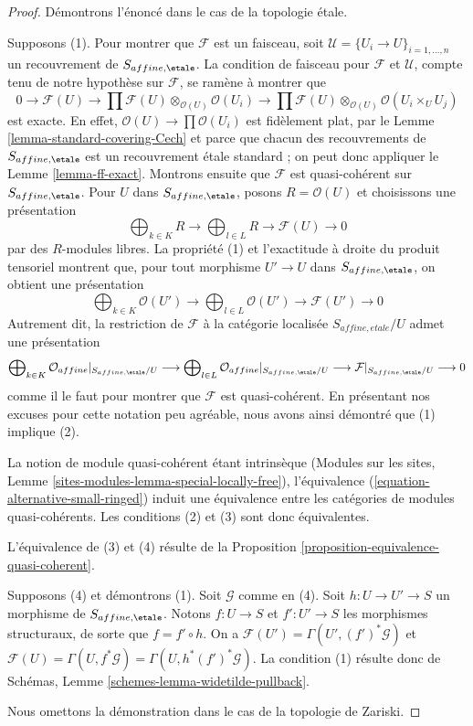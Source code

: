 \begin{proof}
Démontrons l'énoncé dans le cas de la topologie \'etale.

\medskip\noindent
Supposons (1). Pour montrer que $\mathcal{F}$ est un faisceau, soit
$\mathcal{U} = \{U_i \to U\}_{i = 1, \ldots, n}$ un recouvrement de
$S_{affine, \etale}$. La condition de faisceau pour $\mathcal{F}$ et
$\mathcal{U}$, compte tenu de notre hypothèse sur $\mathcal{F}$, se ramène à
montrer que
$$
0 \to \mathcal{F}(U) \to
\prod \mathcal{F}(U) \otimes_{\mathcal{O}(U)} \mathcal{O}(U_i) \to
\prod \mathcal{F}(U) \otimes_{\mathcal{O}(U)} \mathcal{O}(U_i \times_U U_j)
$$
est exacte. En effet, $\mathcal{O}(U) \to \prod \mathcal{O}(U_i)$ est
fidèlement plat, par le Lemme \ref{lemma-standard-covering-Cech} et parce que
chacun des recouvrements de $S_{affine, \etale}$ est un recouvrement
\'etale standard ; on peut donc appliquer le Lemme \ref{lemma-ff-exact}.
Montrons ensuite que $\mathcal{F}$ est quasi-cohérent sur
$S_{affine, \etale}$. Pour $U$ dans $S_{affine, \etale}$, posons
$R = \mathcal{O}(U)$ et choisissons une présentation
$$
\bigoplus\nolimits_{k \in K} R
\longrightarrow
\bigoplus\nolimits_{l \in L} R
\longrightarrow
\mathcal{F}(U)
\longrightarrow 0
$$
par des $R$-modules libres. La propriété (1) et l'exactitude à droite du
produit tensoriel montrent que, pour tout morphisme $U' \to U$ dans
$S_{affine, \etale}$, on obtient une présentation
$$
\bigoplus\nolimits_{k \in K} \mathcal{O}(U')
\longrightarrow
\bigoplus\nolimits_{l \in L} \mathcal{O}(U')
\longrightarrow
\mathcal{F}(U')
\longrightarrow 0
$$
Autrement dit, la restriction de $\mathcal{F}$ à la catégorie localisée
$S_{affine, etale}/U$ admet une présentation
$$
\bigoplus\nolimits_{k \in K} \mathcal{O}_{affine}|_{S_{affine, \etale}/U}
\longrightarrow
\bigoplus\nolimits_{l \in L} \mathcal{O}_{affine}|_{S_{affine, \etale}/U}
\longrightarrow
\mathcal{F}|_{S_{affine, \etale}/U}
\longrightarrow 0
$$
comme il le faut pour montrer que $\mathcal{F}$ est quasi-cohérent.
En présentant nos excuses pour cette notation peu agréable, nous avons ainsi
démontré que (1) implique (2).

\medskip\noindent
La notion de module quasi-cohérent étant intrinsèque (Modules sur les sites,
Lemme \ref{sites-modules-lemma-special-locally-free}), l'équivalence
(\ref{equation-alternative-small-ringed}) induit une équivalence entre les
catégories de modules quasi-cohérents. Les conditions (2) et (3) sont donc
équivalentes.

\medskip\noindent
L'équivalence de (3) et (4) résulte de la
Proposition \ref{proposition-equivalence-quasi-coherent}.

\medskip\noindent
Supposons (4) et démontrons (1). Soit $\mathcal{G}$ comme en (4).
Soit $h : U \to U' \to S$ un morphisme de $S_{affine, \etale}$.
Notons $f : U \to S$ et $f' : U' \to S$ les morphismes structuraux, de sorte
que $f = f' \circ h$. On a
$\mathcal{F}(U') = \Gamma(U', (f')^*\mathcal{G})$ et
$\mathcal{F}(U) = \Gamma(U, f^*\mathcal{G}) = \Gamma(U, h^*(f')^*\mathcal{G})$.
La condition (1) résulte donc de Schémas, Lemme
\ref{schemes-lemma-widetilde-pullback}.

\medskip\noindent
Nous omettons la démonstration dans le cas de la topologie de Zariski.
\end{proof}

